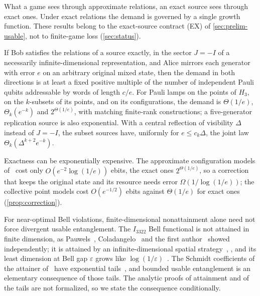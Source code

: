 What a game sees through approximate relations, an exact source sees through exact ones. Under exact relations the demand is
governed by a single growth function. These results belong to the exact-source contract (EX) of \cref{sec:prelim-usable}, not to
finite-game loss (\cref{sec:status}).

\begin{theoremD}
If Bob satisfies the relations of a source exactly, in the sector $J=-I$ of a necessarily infinite-dimensional representation, and
Alice mirrors each generator with error $e$ on an arbitrary original mixed state, then the demand in both directions is at least
a fixed positive multiple of the number of independent Pauli qubits addressable by words of length $c/e$. For Pauli lamps on the
points of $H_3$, on the $k$-subsets of its points, and on its configurations, the demand is $\Theta(1/e)$, $\Theta_k(e^{-k})$ and
$2^{\Theta(1/e)}$, with matching finite-rank constructions; a five-generator replication source is also exponential. With a central
reflection of visibility $\Delta$ instead of $J=-I$, the subset sources have, uniformly for $e\le c_k\Delta$, the joint law
$\Theta_k(\Delta^{k+2}e^{-k})$.
\end{theoremD}

Exactness can be exponentially expensive. The approximate configuration models of~\cite[Proposition~9.4]{DM-game} cost only $O(e^{-2}\log(1/e))$
ebits, the exact ones $2^{\Theta(1/e)}$, so a correction that keeps the original state and its resource needs error
$\Omega(1/\log(1/e))$; the collective point models cost $O(e^{-1/2})$ ebits against $\Theta(1/e)$ for exact ones
(\cref{prop:correction}).

For near-optimal Bell violations, finite-dimensional nonattainment alone need not force divergent usable entanglement. The
$I_{3322}$ Bell functional is not attained in finite dimension, as Pauwels~\cite[Theorem~2]{Pau26}, Coladangelo~\cite[Theorem~11.1]{Col26}
and the first author~\cite[Theorem~1]{Dou26} showed independently; it is attained by an infinite-dimensional spatial
strategy~\cite[Theorem~11.1]{Col26}, \cite[Theorem~2]{Dou26}, and its least dimension at Bell gap $\varepsilon$ grows like
$\log(1/\varepsilon)$~\cite[Theorem~6]{Dou26}. The Schmidt coefficients of the attainer of~\cite{Dou26} have exponential
tails~\cite[Section~5.2]{Dou26}, and bounded usable entanglement is an elementary consequence of those tails. The analytic proofs of
attainment and of the tails are not formalized, so we state the consequence conditionally.


